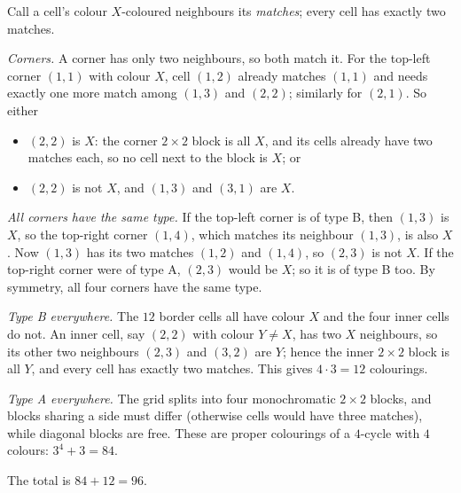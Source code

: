 Call a cell's colour $X$-coloured neighbours its \emph{matches}; every cell has exactly two matches.

\emph{Corners.} A corner has only two neighbours, so both match it. For the top-left corner $(1,1)$ with colour $X$, cell $(1,2)$ already matches $(1,1)$ and needs exactly one more match among $(1,3)$ and $(2,2)$; similarly for $(2,1)$. So either
\begin{itemize}
\item[(A)] $(2,2)$ is $X$: the corner $2\times2$ block is all $X$, and its cells already have two matches each, so no cell next to the block is $X$; or
\item[(B)] $(2,2)$ is not $X$, and $(1,3)$ and $(3,1)$ are $X$.
\end{itemize}
\emph{All corners have the same type.} If the top-left corner is of type B, then $(1,3)$ is $X$, so the top-right corner $(1,4)$, which matches its neighbour $(1,3)$, is also $X$. Now $(1,3)$ has its two matches $(1,2)$ and $(1,4)$, so $(2,3)$ is not $X$. If the top-right corner were of type A, $(2,3)$ would be $X$; so it is of type B too. By symmetry, all four corners have the same type.

\emph{Type B everywhere.} The $12$ border cells all have colour $X$ and the four inner cells do not. An inner cell, say $(2,2)$ with colour $Y\ne X$, has two $X$ neighbours, so its other two neighbours $(2,3)$ and $(3,2)$ are $Y$; hence the inner $2\times2$ block is all $Y$, and every cell has exactly two matches. This gives $4\cdot3=12$ colourings.

\emph{Type A everywhere.} The grid splits into four monochromatic $2\times2$ blocks, and blocks sharing a side must differ (otherwise cells would have three matches), while diagonal blocks are free. These are proper colourings of a $4$-cycle with $4$ colours: $3^4+3=84$.

The total is $84+12=\boxed{96}$.
